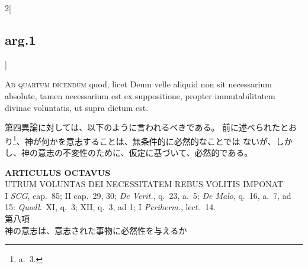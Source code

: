 \documentclass[paper=a4paper,fontsize=10pt,jafontsize=9pt,titlepage]{jlreq}
\begin{document}
\begin{paracol}{2}[\subsection{arg.1}]
\switchcolumn*[\subsection{ad.4}]


{\scshape Ad quartum dicendum} quod, licet Deum velle
 aliquid non sit necessarium absolute, tamen necessarium est ex
 suppositione, propter immutabilitatem divinae voluntatis, ut supra
 dictum est.

\switchcolumn

第四異論に対しては、以下のように言われるべきである。
前に述べられたとおり\footnote{a.~3.}、神が何かを意志することは、無条件的に必然的なことでは
 ないが、しかし、神の意志の不変性のために、仮定に基づいて、必然的である。

\end{paracol}
\newpage



{}
\setcounter{section}{8}
\setcounter{subsection}{0}
\begin{center}
 {\Large {\bfseries ARTICULUS OCTAVUS}}\\
 {\large UTRUM VOLUNTAS DEI NECESSITATEM REBUS VOLITIS IMPONAT}\\
 {\footnotesize I {\itshape SCG}, cap.~85; II cap.~29, 30; {\itshape De
 Verit.}, q.~23, a.~5; {\itshape De Malo}, q.~16, a.~7, ad 15: {\itshape
 Quodl}.~XI, q.~3; XII, q.~3, ad 1; I {\itshape Periherm.}, lect.~14.}\\
 {\Large 第八項\\神の意志は、意志された事物に必然性を与えるか}
\end{center}
\end{document}
